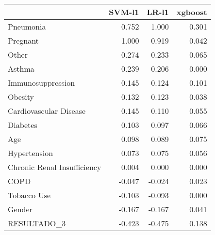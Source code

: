 \begin{tabular}{lrrr}
\toprule
{} &  SVM-l1 &  LR-l1 &  xgboost \\
\midrule
Pneumonia                   &   0.752 &  1.000 &    0.301 \\
Pregnant                    &   1.000 &  0.919 &    0.042 \\
Other                       &   0.274 &  0.233 &    0.065 \\
Asthma                      &   0.239 &  0.206 &    0.000 \\
Immunosuppression           &   0.145 &  0.124 &    0.101 \\
Obesity                     &   0.132 &  0.123 &    0.038 \\
Cardiovascular Disease      &   0.145 &  0.110 &    0.055 \\
Diabetes                    &   0.103 &  0.097 &    0.066 \\
Age                         &   0.098 &  0.089 &    0.075 \\
Hypertension                &   0.073 &  0.075 &    0.056 \\
Chronic Renal Insufficiency &   0.004 &  0.000 &    0.000 \\
COPD                        &  -0.047 & -0.024 &    0.023 \\
Tobacco Use                 &  -0.103 & -0.093 &    0.000 \\
Gender                      &  -0.167 & -0.167 &    0.041 \\
RESULTADO\_3                 &  -0.423 & -0.475 &    0.138 \\
\bottomrule
\end{tabular}
